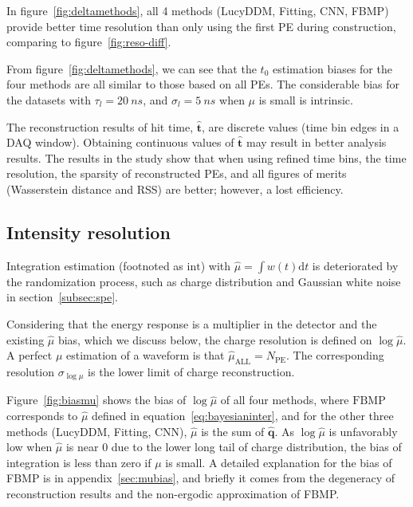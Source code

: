 In figure~\ref{fig:deltamethods}, all 4 methods (LucyDDM, Fitting, CNN, FBMP) provide better time resolution than only using the first PE during construction, comparing to figure~\ref{fig:reso-diff}. 

From figure~\ref{fig:deltamethods}, we can see that the $t_0$ estimation biases for the four methods are all similar to those based on all PEs. The considerable bias for the datasets with $\tau_l=\SI{20}{ns}$, and $\sigma_l=\SI{5}{ns}$ when $\mu$ is small is intrinsic. 


The reconstruction results of hit time, $\bm{\hat{t}}$, are discrete values (time bin edges in a DAQ window). Obtaining continuous values of $\bm{\hat{t}}$ may result in better analysis results. The results in the study show that when using refined time bins, the time resolution, the sparsity of reconstructed PEs, and all figures of merits (Wasserstein distance and RSS) are better; however, a lost efficiency. 

\subsection{Intensity resolution}
\label{subsec:chargereconstruction}

Integration estimation (footnoted as $\mathrm{int}$) with $\hat{\mu}=\int w(t)\mathrm{d}t$ is deteriorated by the randomization process, such as charge distribution and Gaussian white noise in section~\ref{subsec:spe}. 

Considering that the energy response is a multiplier in the detector and the existing $\hat{\mu}$ bias, which we discuss below, the charge resolution is defined on $\log{\hat{\mu}}$. A perfect $\mu$ estimation of a waveform is that $\hat{\mu}_\mathrm{ALL}=N_\mathrm{PE}$. The corresponding resolution $\sigma_{\log\mu}$ is the lower limit of charge reconstruction. 

Figure~\ref{fig:biasmu} shows the bias of $\log\hat{\mu}$ of all four methods, where $\mathrm{FBMP}$ corresponds to $\hat{\mu}$ defined in equation~\eqref{eq:bayesianinter}, and for the other three methods (LucyDDM, Fitting, CNN), $\hat{\mu}$ is the sum of $\hat{\bm{q}}$. As $\log\hat{\mu}$ is unfavorably low when $\hat{\mu}$ is near 0 due to the lower long tail of charge distribution, the bias of integration is less than zero if $\mu$ is small. A detailed explanation for the bias of FBMP is in appendix~\ref{sec:mubias}, and briefly it comes from the degeneracy of reconstruction results and the non-ergodic approximation of FBMP. 


